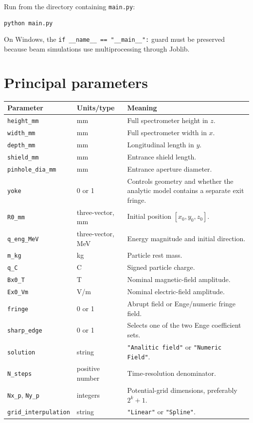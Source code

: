 \documentclass[11pt,a4paper]{report}
\newcommand{\code}[1]{\texttt{#1}}
\begin{document}
Run from the directory containing \code{main.py}:
\begin{lstlisting}[language=bash]
python main.py
\end{lstlisting}
On Windows, the \code{if __name__ == "__main__":} guard must be preserved
because beam simulations use multiprocessing through Joblib.

\section{Principal parameters}
\begin{longtable}{p{}p{}p{}}
\toprule
Parameter & Units/type & Meaning \\
\midrule
\endhead
\code{height\_mm} & mm & Full spectrometer height in $z$. \\
\code{width\_mm} & mm & Full spectrometer width in $x$. \\
\code{depth\_mm} & mm & Longitudinal length in $y$. \\
\code{shield\_mm} & mm & Entrance shield length. \\
\code{pinhole\_dia\_mm} & mm & Entrance aperture diameter. \\
\code{yoke} & 0 or 1 & Controls geometry and whether the analytic model contains a separate exit fringe. \\
\code{R0\_mm} & three-vector, mm & Initial position $[x_0,y_0,z_0]$. \\
\code{q\_eng\_MeV} & three-vector, MeV & Energy magnitude and initial direction. \\
\code{m\_kg} & kg & Particle rest mass. \\
\code{q\_C} & C & Signed particle charge. \\
\code{Bx0\_T} & T & Nominal magnetic-field amplitude. \\
\code{Ex0\_Vm} & V/m & Nominal electric-field amplitude. \\
\code{fringe} & 0 or 1 & Abrupt field or Enge/numeric fringe field. \\
\code{sharp\_edge} & 0 or 1 & Selects one of the two Enge coefficient sets. \\
\code{solution} & string & \code{"Analitic field"} or \code{"Numeric Field"}. \\
\code{N\_steps} & positive number & Time-resolution denominator. \\
\code{Nx\_p}, \code{Ny\_p} & integers & Potential-grid dimensions, preferably $2^k+1$. \\
\code{grid\_interpulation} & string & \code{"Linear"} or \code{"Spline"}. \\
\bottomrule
\end{longtable}
\end{document}
